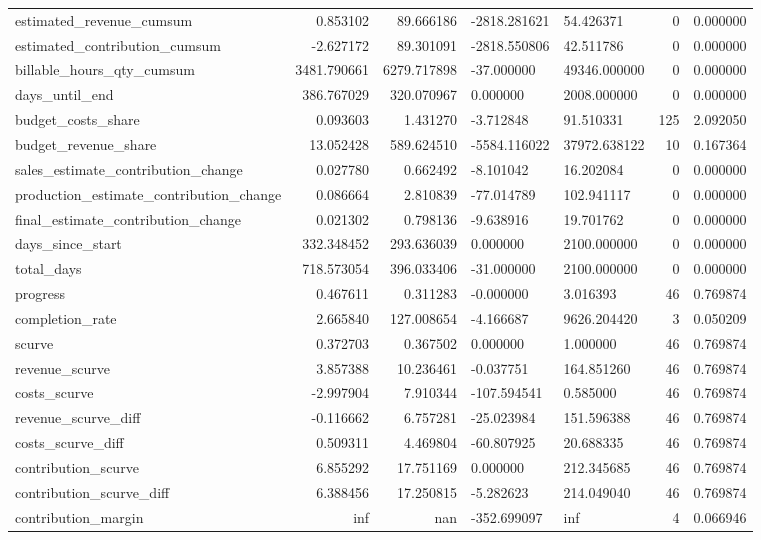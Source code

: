 \begin{landscape}
\begin{longtable}[h!]{lrrllrr}
estimated_revenue_cumsum & 0.853102 & 89.666186 & -2818.281621 & 54.426371 & 0 & 0.000000 \\
estimated_contribution_cumsum & -2.627172 & 89.301091 & -2818.550806 & 42.511786 & 0 & 0.000000 \\
billable_hours_qty_cumsum & 3481.790661 & 6279.717898 & -37.000000 & 49346.000000 & 0 & 0.000000 \\
days_until_end & 386.767029 & 320.070967 & 0.000000 & 2008.000000 & 0 & 0.000000 \\
budget_costs_share & 0.093603 & 1.431270 & -3.712848 & 91.510331 & 125 & 2.092050 \\
budget_revenue_share & 13.052428 & 589.624510 & -5584.116022 & 37972.638122 & 10 & 0.167364 \\
sales_estimate_contribution_change & 0.027780 & 0.662492 & -8.101042 & 16.202084 & 0 & 0.000000 \\
production_estimate_contribution_change & 0.086664 & 2.810839 & -77.014789 & 102.941117 & 0 & 0.000000 \\
final_estimate_contribution_change & 0.021302 & 0.798136 & -9.638916 & 19.701762 & 0 & 0.000000 \\
days_since_start & 332.348452 & 293.636039 & 0.000000 & 2100.000000 & 0 & 0.000000 \\
total_days & 718.573054 & 396.033406 & -31.000000 & 2100.000000 & 0 & 0.000000 \\
progress & 0.467611 & 0.311283 & -0.000000 & 3.016393 & 46 & 0.769874 \\
completion_rate & 2.665840 & 127.008654 & -4.166687 & 9626.204420 & 3 & 0.050209 \\
scurve & 0.372703 & 0.367502 & 0.000000 & 1.000000 & 46 & 0.769874 \\
revenue_scurve & 3.857388 & 10.236461 & -0.037751 & 164.851260 & 46 & 0.769874 \\
costs_scurve & -2.997904 & 7.910344 & -107.594541 & 0.585000 & 46 & 0.769874 \\
revenue_scurve_diff & -0.116662 & 6.757281 & -25.023984 & 151.596388 & 46 & 0.769874 \\
costs_scurve_diff & 0.509311 & 4.469804 & -60.807925 & 20.688335 & 46 & 0.769874 \\
contribution_scurve & 6.855292 & 17.751169 & 0.000000 & 212.345685 & 46 & 0.769874 \\
contribution_scurve_diff & 6.388456 & 17.250815 & -5.282623 & 214.049040 & 46 & 0.769874 \\
contribution_margin & inf & nan & -352.699097 & inf & 4 & 0.066946 \\

\end{longtable}
\end{landscape}
